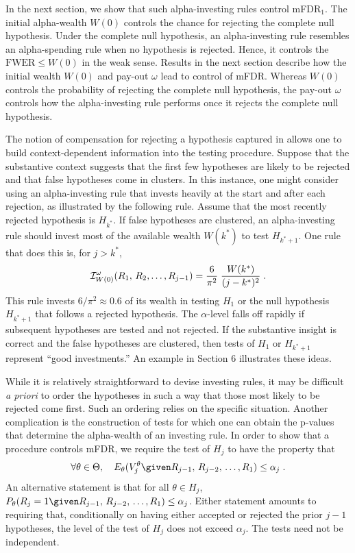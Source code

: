 \documentclass[12pt]{article}
\begin{document}
In the next section, we show that such alpha-investing rules control mFDR${}_{1}$.  The initial
 alpha-wealth $W(0)$ controls the chance for rejecting the complete
 null hypothesis.  Under the complete null hypothesis, an
 alpha-investing rule resembles an alpha-spending rule when no
 hypothesis is rejected.  Hence, it controls the $\mbox{FWER} \le
 W(0)$ in the weak sense.  Results in the next section describe how the initial wealth $W(0)$ and pay-out $\omega$ lead to control of mFDR.
 Whereas $W(0)$ controls the probability of rejecting the complete null
 hypothesis, the pay-out $\omega$ controls how the alpha-investing
 rule performs once it rejects the complete null hypothesis.  
 
 The notion of compensation for rejecting a hypothesis captured in
  allows one to build context-dependent information into
 the testing procedure.  Suppose that the substantive context suggests
 that the first few hypotheses are likely to be rejected and that false hypotheses come in clusters.  In this
 instance, one might consider using an alpha-investing rule that invests heavily at the start and after each rejection, as illustrated  by the following rule.  Assume that the most recently rejected hypothesis is $H_{k^{*}}$.
  If false hypotheses are clustered, an alpha-investing rule should
 invest most of the available wealth $W(k^{*})$ to test $H_{k^{*}+1}$.  One rule that does this is, for $j>k^{*}$,
\begin{equation}
  {\cal I}_{W(0)}^{\omega}(R_1,\, R_2, \ldots,R_{j-1})
     = \frac{6}{\pi^2} \;\frac{W(k^{*})}{(j-k^{*})^2} \;.
\label{eq:I-sqr}
\end{equation}
This rule invests $6/\pi^2 \approx 0.6$ of its wealth in testing $H_1$
 or the null hypothesis $H_{k^{*}+1}$ that follows a rejected
 hypothesis.  The $\alpha$-level falls off rapidly if subsequent
 hypotheses are tested and not rejected. If the substantive insight is
 correct and the false hypotheses are clustered, then tests of
$H_1$ or $H_{k^{*}+1}$ represent ``good  investments.''  An example in Section 6 illustrates these ideas.


While it is relatively straightforward to devise investing rules, it
 may be difficult {\it a priori} to order the hypotheses in such a way
 that those most likely to be rejected come first.  Such an ordering
 relies on the specific situation.  Another complication is
 the construction of tests for which one can obtain the p-values that determine
 the alpha-wealth of an investing rule.  In
 order to show that a procedure controls mFDR, we require the test of
 $H_j$ to have the property that
\begin{equation}
  \forall \theta \in \Theta, \quad
  E_\theta(V^\theta_j \given R_{j-1},\,R_{j-2},\, \ldots, R_1)
  \le \alpha_j   \;.
\label{eq:alpham}
\end{equation}
An alternative statement is that for all $\theta \in H_j$,
 $P_\theta(R_j = 1 \given R_{j-1},\,R_{j-2},\, \ldots, R_1) \le \alpha_j$.
Either statement amounts to requiring that, conditionally on having
either accepted or rejected the prior $j-1$ hypotheses, the level of the test of
$H_j$ does not exceed $\alpha_j$.  The tests need not be independent.
\end{document}
